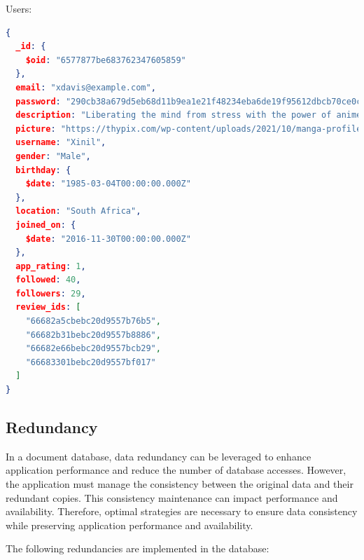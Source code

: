 Users:
\begin{lstlisting}[language=json]
{
  _id: {
    $oid: "6577877be683762347605859"
  },
  email: "xdavis@example.com",
  password: "290cb38a679d5eb68d11b9ea1e21f48234eba6de19f95612dbcb70ce0c7e4e78",
  description: "Liberating the mind from stress with the power of anime zen.",
  picture: "https://thypix.com/wp-content/uploads/2021/10/manga-profile-picture-44.jpg",
  username: "Xinil",
  gender: "Male",
  birthday: {
    $date: "1985-03-04T00:00:00.000Z"
  },
  location: "South Africa",
  joined_on: {
    $date: "2016-11-30T00:00:00.000Z"
  },
  app_rating: 1,
  followed: 40,
  followers: 29,
  review_ids: [
    "66682a5cbebc20d9557b76b5",
    "66682b31bebc20d9557b8886",
    "66682e66bebc20d9557bcb29",
    "66683301bebc20d9557bf017"
  ]
}\end{lstlisting}

\subsection*{Redundancy}

In a document database, data redundancy can be leveraged to enhance application performance and reduce the
number of database accesses. However, the application must manage the consistency between the original data
and their redundant copies. This consistency maintenance can impact performance and availability. Therefore,
optimal strategies are necessary to ensure data consistency while preserving application performance and availability.

\vspace{\baselineskip}

The following redundancies are implemented in the database:

\vspace{\baselineskip}

